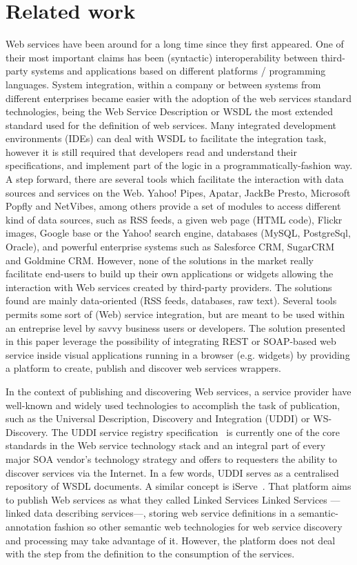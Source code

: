 
\section{Related work}
\label{sec:related_work}

Web services have been around for a long time since they first appeared. One of their most important claims has been (syntactic) interoperability between third-party systems and applications based on different platforms / programming languages. System integration, within a company or between systems from different enterprises became easier with the adoption of the web services standard technologies, being the Web Service Description or WSDL the most extended standard used for the definition of web services. Many integrated development environments (IDEs) can deal with WSDL to facilitate the integration task, however it is still required that developers read and understand their specifications, and implement part of the logic in a programmatically-fashion way. A step forward, there are several tools which facilitate the interaction with data sources and services on the Web. Yahoo! Pipes, Apatar, JackBe Presto, Microsoft Popfly and NetVibes, among others provide a set of modules to access different kind of data sources, such as RSS feeds, a given web page (HTML code), Flickr images, Google base or the Yahoo! search engine, databases (MySQL, PostgreSql, Oracle), and powerful enterprise systems such as Salesforce CRM, SugarCRM and Goldmine CRM. However, none of the solutions in the market really facilitate end-users to build up their own applications or widgets allowing the interaction with Web services created by third-party providers. The solutions found are mainly data-oriented (RSS feeds, databases, raw text). Several tools permits some sort of (Web) service integration, but are meant to be used within an entreprise level by savvy business users or developers. The solution presented in this paper leverage the possibility of integrating REST or SOAP-based web service inside visual applications running in a browser (e.g. widgets) by providing a platform to create, publish and discover web services wrappers.

In the context of publishing and discovering Web services, a service provider have well-known and widely used technologies to accomplish the task of publication, such as the Universal Description, Discovery and Integration (UDDI) or WS-Discovery. The UDDI service registry specification~\cite{uddi2004} is currently one of the core standards in the Web service technology stack and an integral part of every major SOA vendor's technology strategy and offers to requesters the ability to discover services via the Internet. In a few words, UDDI serves as a centralised repository of WSDL documents. A similar concept is iServe~\cite{pedrinaci_ores2010}. That platform aims to publish Web services as what they called Linked Services Linked Services ---linked data describing services---, storing web service definitions in a semantic-annotation fashion so other semantic web technologies for web service discovery and processing may take advantage of it. However, the platform does not deal with the step from the definition to the consumption of the services.

